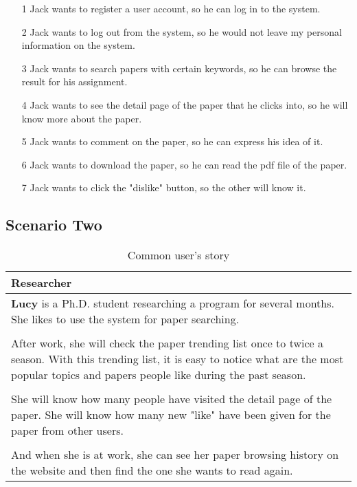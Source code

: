 \begin{itemize}
	\item [1] Jack wants to register a user account, so he can log in to the system.
	\item [2] Jack wants to log out from the system, so he would not leave my personal information on the system.
	\item [3] Jack wants to search papers with certain keywords, so he can browse the result for his assignment.
	\item [4] Jack wants to see the detail page of the paper that he clicks into, so he will know more about the paper.
	\item [5] Jack wants to comment on the paper, so he can express his idea of it.
	\item [6] Jack wants to download the paper, so he can read the pdf file of the paper.
	\item [7] Jack wants to click the "dislike" button, so the other will know it.
\end{itemize}

\subsection*{Scenario Two}

\begin{table}[!ht]
	\renewcommand{\arraystretch}{1.2}
	\centering
	\begin{tabular}{ p{14cm} }
		\hline
		\textbf{Researcher}                                                      \\
		\hline
		\textbf{Lucy} is a Ph.D. student researching a program for several months. She likes to
		use the system for paper searching.                                      \\
		\\
		After work, she will check the paper trending list once to twice a season. With
		this trending list, it is easy to notice what are the most popular topics and
		papers people like during the past season.                               \\
		\\
		She will know how many people have visited the detail page of the paper. She will
		know how many new "like" have been given for the paper from other users. \\
		\\
		And when she is at work, she can see her paper browsing history on the website
		and then find the one she wants to read again.                           \\
		\hline
	\end{tabular}
	\caption{Common user's story}
	\label{table:us2}
\end{table}

